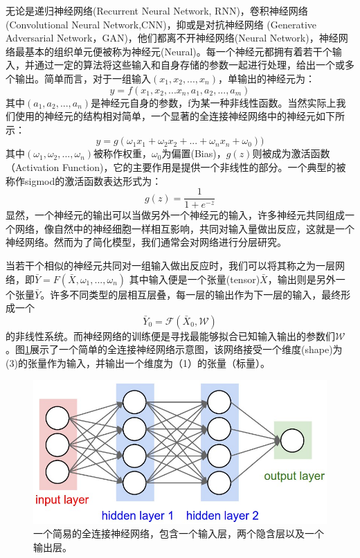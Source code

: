 无论是递归神经网络(Recurrent Neural Network, RNN)，卷积神经网络 
(Convolutional Neural Network,CNN)，抑或是对抗神经网络
(Generative Adversarial Network，GAN)，他们都离不开神经网络(Neural Network)，神经网络最基本的组织单元便被称为神经元(Neural)。每一个神经元都拥有着若干个输入，并通过一定的算法将这些输入和自身存储的参数一起进行处理，给出一个或多个输出。简单而言，对于一组输入$(x_1,x_2,...,x_n)$，单输出的神经元为：
$$ y= f(x_1,x_2,...x_n,a_1,a_2,...,a_m)$$
其中$(a_1,a_2,...,a_n)$是神经元自身的参数，f为某一种非线性函数。当然实际上我们使用的神经元的结构相对简单，一个显著的全连接神经网络中的神经元如下所示：
\begin{equation}
     y=g(\omega_1 x_1+\omega_2 x_2 + ... + \omega_n x_n+ \omega_0))
     \label{eq:neural}
\end{equation}
其中$(\omega_1,\omega_2,...,\omega_n)$被称作权重，$\omega_0$为偏置(Bias)，$g(z)$则被成为激活函数（Activation Function)，它的主要作用是提供一个非线性的部分。一个典型的被称作sigmod的激活函数表达形式为：
$$g(z)=\frac{1}{1+e^{-z}}$$
显然，一个神经元的输出可以当做另外一个神经元的输入，许多神经元共同组成一个网络，像自然中的神经细胞一样相互影响，共同对输入量做出反应，这就是一个神经网络。然而为了简化模型，我们通常会对网络进行分层研究。

当若干个相似的神经元共同对一组输入做出反应时，我们可以将其称之为一层网络，即$\bar Y = F( \bar X, \omega_1,...,\omega_n)$
其中输入便是一个张量(tensor)$\bar X$，输出则是另外一个张量$\bar Y$。许多不同类型的层相互层叠，每一层的输出作为下一层的输入，最终形成一个
\begin{equation}
    \bar Y_0 = \mathcal{F}(\bar X_0, \mathcal{W})
\end{equation}的非线性系统。而神经网络的训练便是寻找最能够拟合已知输入输出的参数们$\mathcal{W}$。图\ref{fig:simple_nn}展示了一个简单的全连接神经网络示意图，该网络接受一个维度(shape)为(3)的张量作为输入，并输出一个维度为（1）的张量（标量）。

\begin{figure}
    \centering
    \includegraphics[width=0.7\columnwidth]{pic/simple_nn.jpeg}
    \caption{一个简易的全连接神经网络，包含一个输入层，两个隐含层以及一个输出层。}
    \label{fig:simple_nn}
\end{figure}

